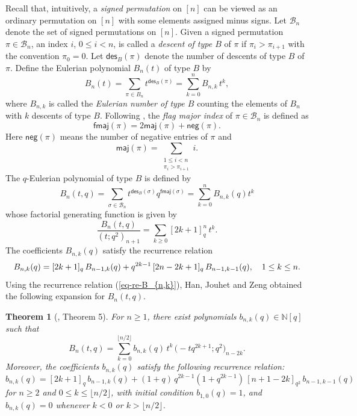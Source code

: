 \documentclass[12pt]{article}
\numberwithin{equation}{section}
\theoremstyle{plain}
\newtheorem{theorem}{Theorem}[section]
\def\des{\mathsf{des}}
\def\maj{\mathsf{maj}}
\def\fmaj{\mathsf{fmaj}}
\def\neg{\mathsf{neg}}
\begin{document}
	 Recall that, intuitively, a {\em signed permutation }on $[n]$ can be viewed as an ordinary permutation on $[n]$ with some elements assigned minus signs.   Let $\mathcal{B}_n$ denote the set of signed permutations on $[n]$.   Given a  signed permutation  $\pi\in \mathcal{B}_{n}$,  an index $i$, $0\leq i< n$,  is called a  {\em descent   of type  $B$} of $\pi$ if $\pi_i>\pi_{i+1}$ with the convention $\pi_0=0$.     Let $\des_B(\pi)$ denote the number of descents of type $B$ of $\pi$. 
	 Define the Eulerian polynomial $B_n(t)$ of type $B$ by
	 \begin{equation}\label{eq-B_n(t)}
	 	B_n(t)=\sum_{\pi\in B_n} t^{\des_B(\pi)}
	 	=\sum_{k=0}^{n} B_{n,k}\, t^k,
	 \end{equation}
	 where $B_{n,k}$ is called  the {\em Eulerian number of type $B$} counting the elements of $B_n$ with $k$  descents of type $B$. Following \cite{AdinBrentiRoichman2001hyperoctahedral},  the {\em flag major index} of $\pi\in \mathcal{B}_n$ is defined as
	 $$
	\fmaj(\pi)=2\maj(\pi)+\neg(\pi).
	 $$
	 Here
	 $\neg(\pi)$ means the number of negative entries of $\pi$ and
	 $$
	 \maj(\pi)=\sum_{\substack{1\leq i<n\\ \pi_i>\pi_{i+1}}} i.
	 $$
	 The $q$-Eulerian polynomial of type $B$ \cite{ChowGessel2007hyperoctahedral} is defined by
	 \begin{equation}\label{eq:qEulerA-def}
	 	B_n(t,q)=\sum_{\sigma\in \mathcal{B}_n} t^{\des_B(\sigma)} q^{\fmaj(\sigma)}
	 	=\sum\limits_{k= 0}^{n}B_{n,k}(q)t^{k}
	 \end{equation}
	 whose  factorial generating function is given by 
	\begin{equation}\label{eq-gen-B}
		\frac{B_n(t,q)}{(t;q^2)_{n+1}}=\sum_{k\ge 0}[2k+1]_q^n\, t^k.
	\end{equation}
	The coefficients $B_{n,k}(q)$ satisfy the recurrence relation 
	\begin{equation}\label{eq-re-B_{n,k}}
		B_{n,k}(q)=[2k+1]_q\, B_{n-1,k}(q)+ q^{2k-1}\,[2n-2k+1]_q\, B_{n-1,k-1}(q),\quad 1\le k\le n.
	\end{equation}
	Using the recurrence relation (\ref{eq-re-B_{n,k}}), Han, Jouhet and Zeng \cite{HanJouhetZeng2013qtriangles} obtained the following expansion for $B_n(t,q)$.
	 \begin{theorem}[\cite{HanJouhetZeng2013qtriangles}, Theorem 5] \label{thm-Han-2}
	 	For $n\geq 1$, there exist polynomials $b_{n,k}(q)\in\mathbb{N}[q]$ such that 
	 	\begin{equation}\label{eq-Han-B}
	 		B_n(t,q)
	 		=\sum_{k=0}^{\lfloor n/2\rfloor} b_{n,k}(q)\, t^k\, \bigl(-tq^{2k+1};q^2\bigr)_{n-2k}.
	 	\end{equation}
	 	Moreover, the coefficients $b_{n,k}(q)$ satisfy  the following recurrence relation:
	 	\begin{equation}\label{eq-re-2}
	 		b_{n,k}(q) = [2k+1]_q\, b_{n-1,k}(q)
	 		+ (1+q)\,q^{2k-1}(1+q^{2k-1})\,[n+1-2k]_{q^2}\, b_{n-1,k-1}(q)
	 	\end{equation}
	 	for $n\ge 2$ and $0\le k\le \lfloor n/2\rfloor$, with initial condition $b_{1,0}(q)=1$, and $b_{n,k}(q)=0$ whenever $k<0$ or $k>\lfloor n/2\rfloor$.
	 \end{theorem}
\end{document}
